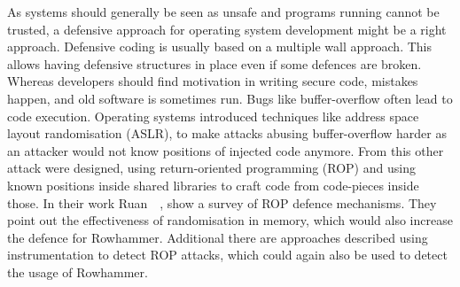 As systems should generally be seen as unsafe and programs running cannot be
trusted, a defensive approach for operating system development might be a right
approach. Defensive coding is usually based on a multiple wall approach. This
allows having defensive structures in place even if some defences are broken.
Whereas developers should find motivation in writing secure code, mistakes
happen, and old software is sometimes run. Bugs like buffer-overflow often lead
to code execution. Operating systems introduced techniques like address space
layout randomisation (ASLR), to make attacks abusing buffer-overflow harder as
an attacker would not know positions of injected code anymore. From this other
attack were designed, using return-oriented programming (ROP) and using known
positions inside shared libraries to craft code from code-pieces inside those.
In their work Ruan~\etal~\cite{ropsur}, show a survey of ROP defence mechanisms.
They point out the effectiveness of randomisation in memory, which would also
increase the defence for Rowhammer. Additional there are approaches described
using instrumentation to detect ROP attacks, which could again also be used to
detect the usage of Rowhammer.

